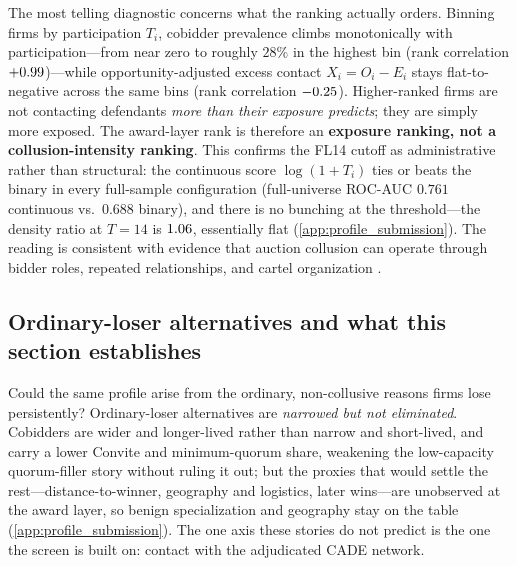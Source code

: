 The most telling diagnostic concerns what the ranking actually orders.
Binning firms by participation $T_i$, cobidder prevalence climbs
monotonically with participation---from near zero to roughly $28\%$ in
the highest bin (rank correlation $+0.99$)---while
opportunity-adjusted excess contact $X_i = O_i - E_i$ stays
flat-to-negative across the same bins (rank correlation
$-0.25$). Higher-ranked firms are not contacting
defendants \emph{more than their exposure predicts}; they are simply
more exposed. The award-layer rank is therefore an \textbf{exposure
ranking, not a collusion-intensity ranking}. This confirms the FL14
cutoff as administrative rather than structural: the continuous score
$\log(1+T_i)$ ties or beats the binary in every full-sample
configuration (full-universe ROC-AUC $0.761$ continuous vs.\ $0.688$
binary), and there is no bunching at the threshold---the density ratio
at $T=14$ is $1.06$, essentially flat
(\ref{app:profile_submission}). The reading is consistent with evidence
that auction collusion can operate through bidder roles, repeated
relationships, and cartel organization
\citep{baldwin1997bidder,porter1999ohio,pesendorfer2000study,asker2010leniency}.

\subsection{Ordinary-loser alternatives and what this section establishes}
\label{sec:ordinary_5_4}

Could the same profile arise from the ordinary, non-collusive reasons
firms lose persistently? Ordinary-loser alternatives are \emph{narrowed
but not eliminated}. Cobidders are wider and longer-lived rather than
narrow and short-lived, and carry a lower Convite and minimum-quorum
share, weakening the low-capacity quorum-filler story without ruling it
out; but the proxies that would settle the rest---distance-to-winner,
geography and logistics, later wins---are unobserved at the award layer,
so benign specialization and geography stay on the table
(\ref{app:profile_submission}). The one axis these stories do not
predict is the one the screen is built on: contact with the adjudicated
CADE network.

